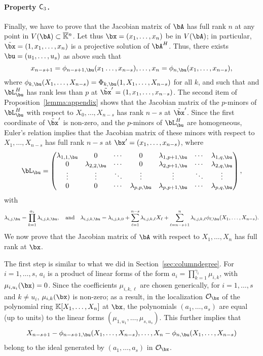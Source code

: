 \documentclass[12pt]{article}
\begin{document}
\paragraph{Property $\mathsf{C}_3$.} Finally, we have to prove that the Jacobian
matrix of $\bA$ has full rank $n$ at any point in $V(\bA) \subset
\KKbar{}^n$. Let thus $\bx=(x_1,\dots,x_n)$ be in $V(\bA)$; in
particular, $\tilde \bx=(1,x_1,\dots,x_n)$ is a projective solution of
$\bA^H$.  Thus, there exists $\bu=(u_1,\dots,u_s)$ as above such that
$$x_{n-s+1}=\phi_{n-s+1,\bu}(x_1\dots,x_{n-s}),\dots,x_{n}=\phi_{n,\bu}(x_1,\dots,x_{n-s}),$$
where $\phi_{k,\bu}(X_1,\dots,X_{n-s})=\Phi_{k,\bu}(1,X_1,\dots,X_{n-s})$ for 
all $k$, and such that
and $\bL^H_\bu$ has rank less than $p$ at $\tilde\bx'=(1,x_1,\dots,x_{n-s})$.  The second item of
Proposition~\ref{lemma:appendix} shows that the Jacobian matrix of
the $p$-minors of 
$\bL^H_\bu$ with respect to $X_0,\dots,X_{n-s}$ has rank $n-s$
at $\tilde \bx'$. Since the first coordinate of $\tilde\bx'$ is non-zero,
and the $p$-minors  of $\bL^H_\bu$ are homogeneous,
Euler's relation implies that the Jacobian matrix of 
these minors
with respect to $X_1,\dots,X_{n-s}$
has full rank $n-s$ at $\bx'=(x_1,\dots,x_{n-s})$, where  
\begin{align}\label{eqdef:Lu}
 \bL_\bu = \left( \begin{matrix}
\lambda_{1,1,\bu} & 0 & \cdots & 0 & \lambda_{1,p+1,\bu} & \cdots & \lambda_{1, q,\bu}\\
0 & \lambda_{2,2,\bu} & \cdots & 0 & \lambda_{2,p+1,\bu} & \cdots & \lambda_{2, q,\bu}\\
\vdots & \vdots & \ddots & \vdots & \vdots & \ddots & \vdots\\
0 & 0 & \cdots & \lambda_{p,p,\bu} & \lambda_{p,p+1,\bu} & \cdots & \lambda_{p, q,\bu}
\end{matrix} \right),
\end{align}
with
$$\lambda_{i,j,\bu}=\prod_{k=1}^{\alpha_i}\lambda_{i,j,k,\bu},
\quad\text{and}\quad \lambda_{i,j,k,\bu}=\lambda_{i,j,k,0}+\sum_{\ell
  = 1}^{n-s}\lambda_{i,j,k,\ell}X_\ell + \sum_{\ell =
  n-s+1}^{n}\lambda_{i,j,k,\ell}
\phi_{\ell,\bu}(X_1,\dots,X_{n-s}).$$ We now prove
that the Jacobian matrix of $\bA$ with respect to $X_1,\dots,X_n$ has
full rank at $\bx$.

The first step is similar to what we did in Section~\ref{sec:columndegree}.  For
$i=1,\dots,s$, $a_i$ is a product of linear forms of the form
$a_i=\prod_{k=1}^{\gamma_i} \mu_{i,k}$, with $\mu_{i,u_i}(\bx)=0$.
Since the coefficients $\mu_{i,k,\ell}$ are chosen generically, for
$i=1,\dots,s$ and $k \ne u_i$, $\mu_{i,k}(\bx)$ is non-zero; as a
result, in the localization  $\mathcal{O}_\bx$ of the polynomial ring $\mathbb{K}[X_1,\dots,X_{n}]$ at $\bx$,
 the polynomials $(a_1,\dots,a_s)$
are equal (up to units) to the linear forms
$(\mu_{1,u_1},\dots,\mu_{s,u_s})$. This further implies that
\begin{align}\label{eq:subst}
X_{n-s+1}-\phi_{n-s+1,\bu}(X_1,\dots,X_{n-s}),\dots,X_{n}-\phi_{n,\bu}(X_1,\dots,X_{n-s})
\end{align}
belong to the ideal generated by $(a_1,\dots,a_s)$ in
$\mathcal{O}_\bx$.
\end{document}
